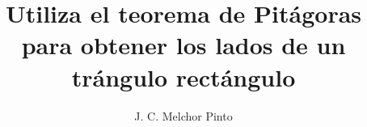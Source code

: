 \documentclass[12pt]{guia}
\title{Utiliza el teorema de Pitágoras para obtener los lados de un trángulo rectángulo}
\author{J. C. Melchor Pinto}
\begin{document}
\pagestyle{headandfoot}
\addpoints
\INFO
\printanswers


\newpage
\begin{questions}
    
    
    
    
    
    
    
    
    
    
    
    
    
    
\end{questions}
\end{document}
